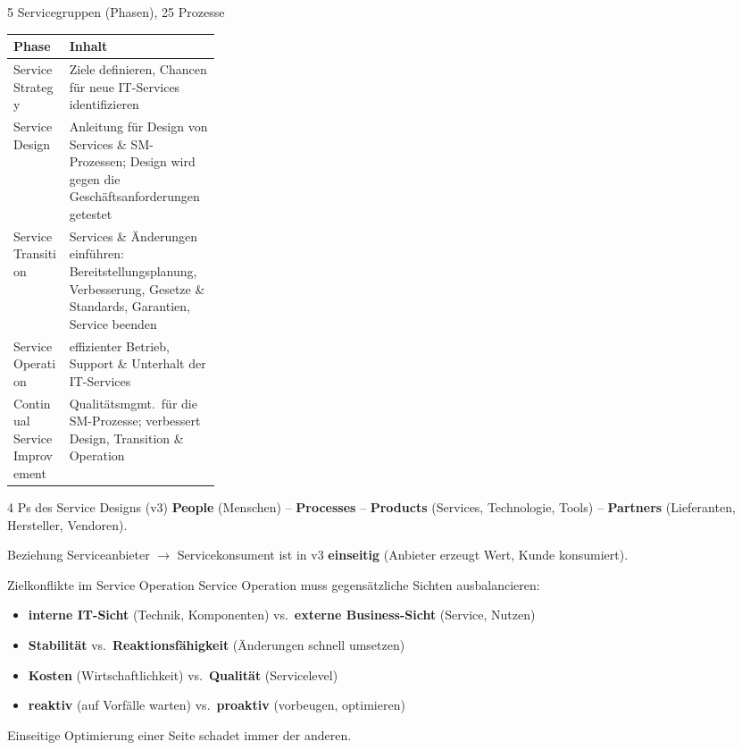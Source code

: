 \documentclass[a4paper, fontsize=7pt]{scrartcl}
\renewcommand*{\arraystretch}{1.5}  %
\begin{document}
\begin{mainbox}{5 Servicegruppen (Phasen), 25 Prozesse}
\renewcommand*{\arraystretch}{1.2}
\begin{tabularx}{\linewidth}{@{}>{\raggedright\arraybackslash}p{0.27\linewidth}|>{\raggedright\arraybackslash}X@{}}
\textbf{Phase} & \textbf{Inhalt} \\
\hline
Service Strategy & Ziele definieren, Chancen für neue IT-Services
  identifizieren \\
Service Design & Anleitung für Design von Services \& SM-Prozessen; Design
  wird gegen die Geschäftsanforderungen getestet \\
Service Transition & Services \& Änderungen einführen: Bereitstellungsplanung,
  Verbesserung, Gesetze \& Standards, Garantien, Service beenden \\
Service Operation & effizienter Betrieb, Support \& Unterhalt der
  IT-Services \\
Continual Service Improvement & Qualitätsmgmt.\ für die SM-Prozesse;
  verbessert Design, Transition \& Operation \\
\end{tabularx}
\end{mainbox}

\begin{mainbox}{4 Ps des Service Designs (v3)}
\textbf{People} (Menschen) -- \textbf{Processes} -- \textbf{Products}
(Services, Technologie, Tools) -- \textbf{Partners} (Lieferanten, Hersteller,
Vendoren).

Beziehung Serviceanbieter $\to$ Servicekonsument ist in v3
\textbf{einseitig} (Anbieter erzeugt Wert, Kunde konsumiert).
\end{mainbox}

\begin{mainbox}{Zielkonflikte im Service Operation}
Service Operation muss gegensätzliche Sichten ausbalancieren:
\begin{itemize}
    \item \textbf{interne IT-Sicht} (Technik, Komponenten) vs.\
          \textbf{externe Business-Sicht} (Service, Nutzen)
    \item \textbf{Stabilität} vs.\ \textbf{Reaktionsfähigkeit}
          (Änderungen schnell umsetzen)
    \item \textbf{Kosten} (Wirtschaftlichkeit) vs.\ \textbf{Qualität}
          (Servicelevel)
    \item \textbf{reaktiv} (auf Vorfälle warten) vs.\ \textbf{proaktiv}
          (vorbeugen, optimieren)
\end{itemize}
Einseitige Optimierung einer Seite schadet immer der anderen.
\end{mainbox}
\end{document}
